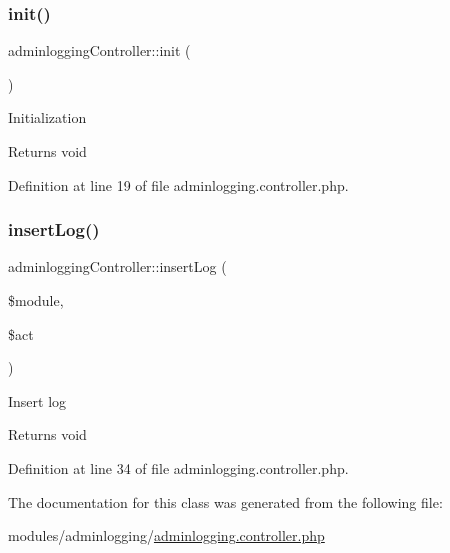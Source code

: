 \subsubsection{\texorpdfstring{init()}{init()}}
{\footnotesize\ttfamily adminlogging\+Controller\+::init (\begin{DoxyParamCaption}{ }\end{DoxyParamCaption})}

Initialization \begin{DoxyReturn}{Returns}
void 
\end{DoxyReturn}


Definition at line 19 of file adminlogging.\+controller.\+php.

\hypertarget{classadminloggingController_aaf6283ad1e303a0b8f475013f442c20a}{}\label{classadminloggingController_aaf6283ad1e303a0b8f475013f442c20a} 
\subsubsection{\texorpdfstring{insert\+Log()}{insertLog()}}
{\footnotesize\ttfamily adminlogging\+Controller\+::insert\+Log (\begin{DoxyParamCaption}\item[{}]{\$module,  }\item[{}]{\$act }\end{DoxyParamCaption})}

Insert log \begin{DoxyReturn}{Returns}
void 
\end{DoxyReturn}


Definition at line 34 of file adminlogging.\+controller.\+php.



The documentation for this class was generated from the following file\+:\begin{DoxyCompactItemize}
\item 
modules/adminlogging/\hyperlink{adminlogging_8controller_8php}{adminlogging.\+controller.\+php}\end{DoxyCompactItemize}
